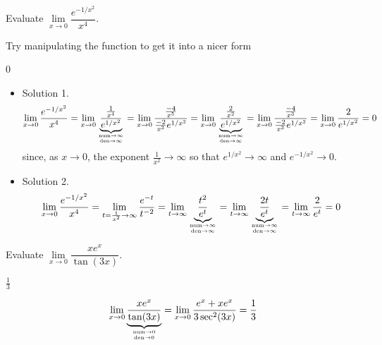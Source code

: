 \begin{Mquestion}[1996D]
Evaluate $\lim\limits_{x\rightarrow 0}\dfrac{e^{-1/x^2}}{x^4}$.
\end{Mquestion}
\begin{hint} Try manipulating the function to get it into a nicer form
\end{hint}
\begin{answer} 0
\end{answer}
\begin{solution}
\begin{itemize}
\item Solution 1.
$$
\lim_{x\rightarrow 0}\frac{e^{-1/x^2}}{x^4}
=\lim_{x\rightarrow 0}\underbrace{\frac{\frac{1}{x^4}}{e^{1/x^2}}}_{\atp
	{\mathrm{num}\to\infty}
	{\mathrm{den}\to\infty}}
=\lim_{x\rightarrow 0}\frac{\frac{-4}{x^5}}{\frac{-2}{x^3}e^{1/x^2}}
=\lim_{x\rightarrow 0}\underbrace{\frac{\frac{2}{x^2}}{e^{1/x^2}}}_{\atp
	{\mathrm{num}\to\infty}
	{\mathrm{den}\to\infty}}
=\lim_{x\rightarrow 0}\frac{\frac{-4}{x^3}}{\frac{-2}{x^3}e^{1/x^2}}
=\lim_{x\rightarrow 0}\frac{2}{e^{1/x^2}}
={0}
$$
since, as $x\rightarrow 0$, the exponent $\frac{1}{x^2}\rightarrow\infty$
so that $e^{1/x^2}\rightarrow\infty$ and $e^{-1/x^2}\rightarrow 0$.
\item Solution 2.
$$
\lim_{x\rightarrow 0}\frac{e^{-1/x^2}}{x^4}
=\lim_{t={1\over x^2}\rightarrow \infty}\frac{e^{-t}}{t^{-2}}
=\lim_{t\rightarrow \infty}\underbrace{\frac{t^2}{e^{t}}}_{\atp
	{\mathrm{num}\to\infty}
	{\mathrm{den}\to\infty}}
=\lim_{t\rightarrow \infty}\underbrace{\frac{2t}{e^{t}}}_{\atp
	{\mathrm{num}\to\infty}
	{\mathrm{den}\to\infty}}
=\lim_{t\rightarrow \infty}\frac{2}{e^{t}}
={0}
$$
\end{itemize}
\end{solution}




\begin{question}[1998H]
Evaluate $\lim\limits_{x\rightarrow 0}
\dfrac{xe^x}{\tan (3x)}$.
\end{question}
\begin{answer} $\frac{1}{3}$
\end{answer}
\begin{solution} $$
\lim_{x\rightarrow 0}\underbrace{\frac{xe^x}{\tan (3x)}}_{\atp
	{\mathrm{num}\to0}
	{\mathrm{den}\to0}}
= \lim_{x\rightarrow 0}\frac{e^x+xe^x}{3\sec^2 (3x)}
=\frac{1}{3}
$$
\end{solution}



